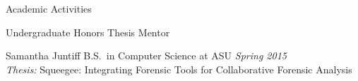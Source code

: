 
\begin{rSection}{Academic Activities}

  \begin{rBulletSubsection}{Undergraduate Honors Thesis Mentor}

    \item Samantha Juntiff \hfill B.S.\ in Computer Science at ASU \hfill \emph{Spring 2015}\\%
    \emph{Thesis:} Squeegee: Integrating Forensic Tools for Collaborative Forensic Analysis

  \end{rBulletSubsection}

\end{rSection}

